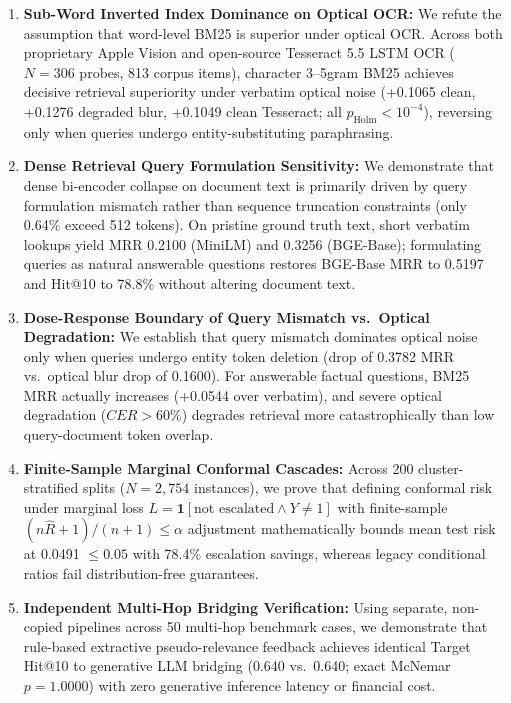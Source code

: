 \begin{enumerate}
    \item \textbf{Sub-Word Inverted Index Dominance on Optical OCR:} We refute the assumption that word-level BM25 is superior under optical OCR. Across both proprietary Apple Vision and open-source Tesseract 5.5 LSTM OCR ($N=306$ probes, 813 corpus items), character 3--5gram BM25 achieves decisive retrieval superiority under verbatim optical noise (+0.1065 clean, +0.1276 degraded blur, +0.1049 clean Tesseract; all $p_{\text{Holm}} < 10^{-4}$), reversing only when queries undergo entity-substituting paraphrasing.
    \item \textbf{Dense Retrieval Query Formulation Sensitivity:} We demonstrate that dense bi-encoder collapse on document text is primarily driven by query formulation mismatch rather than sequence truncation constraints (only 0.64\% exceed 512 tokens). On pristine ground truth text, short verbatim lookups yield MRR 0.2100 (MiniLM) and 0.3256 (BGE-Base); formulating queries as natural answerable questions restores BGE-Base MRR to 0.5197 and Hit@10 to 78.8\% without altering document text.
    \item \textbf{Dose-Response Boundary of Query Mismatch vs.\ Optical Degradation:} We establish that query mismatch dominates optical noise only when queries undergo entity token deletion (drop of 0.3782 MRR vs.\ optical blur drop of 0.1600). For answerable factual questions, BM25 MRR actually increases (+0.0544 over verbatim), and severe optical degradation ($CER > 60\%$) degrades retrieval more catastrophically than low query-document token overlap.
    \item \textbf{Finite-Sample Marginal Conformal Cascades:} Across 200 cluster-stratified splits ($N=2{,}754$ instances), we prove that defining conformal risk under marginal loss $L = \mathbf{1}[\text{not escalated} \land Y \ne 1]$ with finite-sample $(n\hat{R}+1)/(n+1) \le \alpha$ adjustment mathematically bounds mean test risk at 0.0491 $\le 0.05$ with 78.4\% escalation savings, whereas legacy conditional ratios fail distribution-free guarantees.
    \item \textbf{Independent Multi-Hop Bridging Verification:} Using separate, non-copied pipelines across 50 multi-hop benchmark cases, we demonstrate that rule-based extractive pseudo-relevance feedback achieves identical Target Hit@10 to generative LLM bridging (0.640 vs.\ 0.640; exact McNemar $p = 1.0000$) with zero generative inference latency or financial cost.
\end{enumerate}
